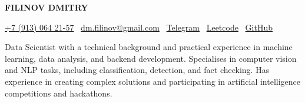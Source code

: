 \begin{center}
  {\huge\rmfamily\bfseries FILINOV DMITRY}
\end{center}
\begin{center}
\href{tel:+79130642157}{+7 (913) 064 21-57} \textbar\ 
\href{mailto:dm.filinov@gmail.com}{dm.filinov@gmail.com} \textbar\
  \href{https://t.me/D1ffic00lt}{Telegram} \textbar\ 
  \href{https://leetcode.com/u/D1ffic00lt/}{Leetcode} \textbar\ 
  \href{https://github.com/D1ffic00lt}{GitHub}
\end{center}
Data Scientist with a technical background and practical experience in machine learning, data analysis, and backend development. Specialises in computer vision and NLP tasks, including classification, detection, and fact checking. Has experience in creating complex solutions and participating in artificial intelligence competitions and hackathons.
